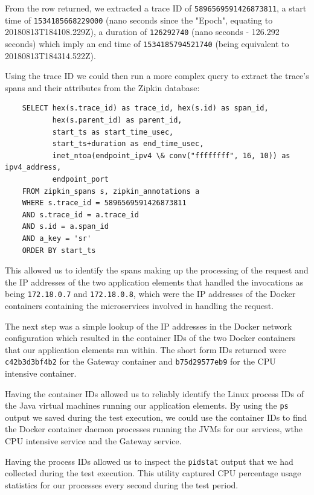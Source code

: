 From the row returned, we extracted a trace ID of \texttt{5896569591426873811}, a start time of \texttt{1534185668229000} (nano seconds since the "Epoch", equating to 20180813T184108.229Z), a duration of \texttt{126292740} (nano seconds - 126.292 seconds)	which imply an end time of \texttt{1534185794521740} (being equivalent to 20180813T184314.522Z).

Using the trace ID we could then run a more complex query to extract the trace's spans and their attributes from the Zipkin database:

\lstset{language=SQL}
\begin{lstlisting}
	SELECT hex(s.trace_id) as trace_id, hex(s.id) as span_id,
	       hex(s.parent_id) as parent_id,
	       start_ts as start_time_usec, 
	       start_ts+duration as end_time_usec,
	       inet_ntoa(endpoint_ipv4 \& conv("ffffffff", 16, 10)) as ipv4_address,
	       endpoint_port
	FROM zipkin_spans s, zipkin_annotations a
	WHERE s.trace_id = 5896569591426873811
	AND s.trace_id = a.trace_id
	AND s.id = a.span_id
	AND a_key = 'sr'
	ORDER BY start_ts
\end{lstlisting}

This allowed us to identify the spans making up the processing of the request and the IP addresses of the two application elements that handled the invocations as being \texttt{172.18.0.7} and \texttt{172.18.0.8}, which were the IP addresses of the Docker containers containing the microservices involved in handling the request.

The next step was a simple lookup of the IP addresses in the Docker network configuration which resulted in the container IDs of the two Docker containers that our application elements ran within.  The short form IDs returned were \texttt{c42b3d3bf4b2} for the Gateway container and \texttt{b75d29577eb9} for the CPU intensive container.

Having the container IDs allowed us to reliably identify the Linux process IDs of the Java virtual machines running our application elements.  By using the \texttt{ps} output we saved during the test execution, we could use the container IDs to find the Docker container daemon  processes running the JVMs for our services, wthe CPU intensive service and the Gateway service.

Having the process IDs allowed us to inspect the \texttt{pidstat} output that we had collected during the test execution.   This utility captured CPU percentage usage statistics for our processes every second during the test period.

